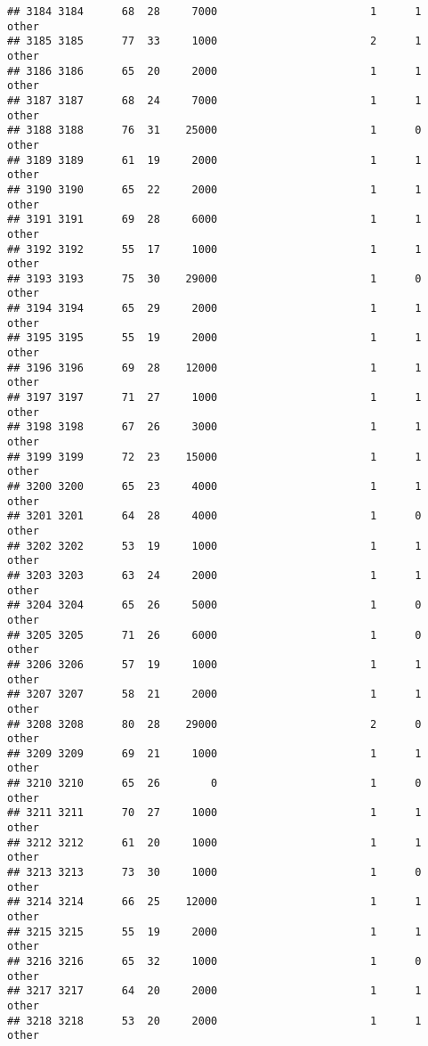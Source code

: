 \documentclass[
]{article}
\begin{document}
\begin{verbatim}
## 3184 3184      68  28     7000                        1      1    other
## 3185 3185      77  33     1000                        2      1    other
## 3186 3186      65  20     2000                        1      1    other
## 3187 3187      68  24     7000                        1      1    other
## 3188 3188      76  31    25000                        1      0    other
## 3189 3189      61  19     2000                        1      1    other
## 3190 3190      65  22     2000                        1      1    other
## 3191 3191      69  28     6000                        1      1    other
## 3192 3192      55  17     1000                        1      1    other
## 3193 3193      75  30    29000                        1      0    other
## 3194 3194      65  29     2000                        1      1    other
## 3195 3195      55  19     2000                        1      1    other
## 3196 3196      69  28    12000                        1      1    other
## 3197 3197      71  27     1000                        1      1    other
## 3198 3198      67  26     3000                        1      1    other
## 3199 3199      72  23    15000                        1      1    other
## 3200 3200      65  23     4000                        1      1    other
## 3201 3201      64  28     4000                        1      0    other
## 3202 3202      53  19     1000                        1      1    other
## 3203 3203      63  24     2000                        1      1    other
## 3204 3204      65  26     5000                        1      0    other
## 3205 3205      71  26     6000                        1      0    other
## 3206 3206      57  19     1000                        1      1    other
## 3207 3207      58  21     2000                        1      1    other
## 3208 3208      80  28    29000                        2      0    other
## 3209 3209      69  21     1000                        1      1    other
## 3210 3210      65  26        0                        1      0    other
## 3211 3211      70  27     1000                        1      1    other
## 3212 3212      61  20     1000                        1      1    other
## 3213 3213      73  30     1000                        1      0    other
## 3214 3214      66  25    12000                        1      1    other
## 3215 3215      55  19     2000                        1      1    other
## 3216 3216      65  32     1000                        1      0    other
## 3217 3217      64  20     2000                        1      1    other
## 3218 3218      53  20     2000                        1      1    other

\end{verbatim}
\end{document}
